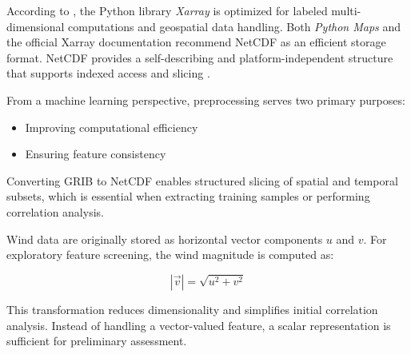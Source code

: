 According to \textcite[pp.~85--87]{python_maps}, the Python library \textit{Xarray} is optimized for labeled multi-dimensional computations and geospatial data handling. Both \textit{Python Maps} \parencite[p.~88]{python_maps} and the official Xarray documentation \parencite{xarray_documentation} recommend NetCDF as an efficient storage format. NetCDF provides a self-describing and platform-independent structure that supports indexed access and slicing \parencite{netcdf_documentation}.

From a machine learning perspective, preprocessing serves two primary purposes:

\begin{itemize}
    \item Improving computational efficiency
    \item Ensuring feature consistency
\end{itemize}

Converting GRIB to NetCDF enables structured slicing of spatial and temporal subsets, which is essential when extracting training samples or performing correlation analysis.

Wind data are originally stored as horizontal vector components $u$ and $v$. For exploratory feature screening, the wind magnitude is computed as:

\[
|\vec{v}| = \sqrt{u^2 + v^2}
\]

This transformation reduces dimensionality and simplifies initial correlation analysis. Instead of handling a vector-valued feature, a scalar representation is sufficient for preliminary assessment.

